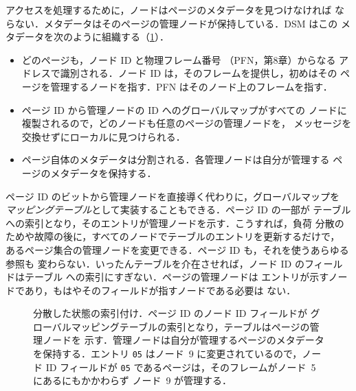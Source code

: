 \documentclass[../main.tex]{subfiles}
\begin{document}
アクセスを処理するために，ノードはページのメタデータを見つけなければ
ならない．メタデータはそのページの管理ノードが保持している．DSM はこの
メタデータを次のように組織する（\cref{fig:l15-indexing}）．
\begin{itemize}
  \item どのページも，ノード ID と物理フレーム番号
    （PFN，第8章）からなる
    アドレスで識別される．ノード ID は，そのフレームを提供し，初めはその
    ページを管理するノードを指す．PFN はそのノード上のフレームを指す．
  \item ページ ID から管理ノードの ID へのグローバルマップがすべての
    ノードに複製されるので，どのノードも任意のページの管理ノードを，
    メッセージを交換せずにローカルに見つけられる．
  \item ページ自体のメタデータは分割される．各管理ノードは自分が管理する
    ページのメタデータを保持する．
\end{itemize}
ページ ID のビットから管理ノードを直接導く代わりに，グローバルマップを
\emph{マッピングテーブル}として実装することもできる．ページ ID の一部が
テーブルへの索引となり，そのエントリが管理ノードを示す．こうすれば，負荷
分散のためや故障の後に，すべてのノードでテーブルのエントリを更新するだけで，
あるページ集合の管理ノードを変更できる．ページ ID も，それを使うあらゆる参照も
変わらない．いったんテーブルを介在させれば，ノード ID のフィールドはテーブル
への索引にすぎない．ページの管理ノードは
エントリが示すノードであり，もはやそのフィールドが指すノードである必要は
ない．

\begin{figure}[htbp]
  \centering
  
  \caption{分散した状態の索引付け．ページ ID のノード ID フィールドが
    グローバルマッピングテーブルの索引となり，テーブルはページの管理ノードを
    示す．管理ノードは自分が管理するページのメタデータを保持する．エントリ
    \texttt{05} はノード~9 に変更されているので，ノード ID フィールドが
    \texttt{05} であるページは，そのフレームがノード~5 にあるにもかかわらず
    ノード~9 が管理する．}
  \label{fig:l15-indexing}
\end{figure}
\end{document}
